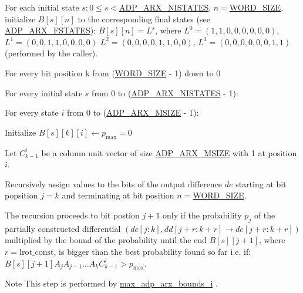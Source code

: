 \begin{DoxyItemize}
\item \-For each initial state $s: 0 \le s <$\hyperlink{adp-arx_8hh_af9236f8d08a54b97ed2199271de979f6}{\-A\-D\-P\-\_\-\-A\-R\-X\-\_\-\-N\-I\-S\-T\-A\-T\-E\-S}, $n =$\hyperlink{common_8hh_a92ed8507d1cd2331ad09275c5c4c1c89}{\-W\-O\-R\-D\-\_\-\-S\-I\-Z\-E}, initialize $B[s][n]$ to the corresponding final states (see \hyperlink{adp-arx_8hh_af70040b1b46c82f1fbe37b5bab89d7db}{\-A\-D\-P\-\_\-\-A\-R\-X\-\_\-\-F\-S\-T\-A\-T\-E\-S})\-: $B[s][n] = L^{s}$, where $L^{0} = (1,1,0,0,0,0,0,0)$, $L^{1} = (0,0,1,1,0,0,0,0)$ $L^{2} = (0,0,0,0,1,1,0,0)$, $L^{3} = (0,0,0,0,0,0,1,1)$ (performed by the caller).
\item \-For every bit position k from (\hyperlink{common_8hh_a92ed8507d1cd2331ad09275c5c4c1c89}{\-W\-O\-R\-D\-\_\-\-S\-I\-Z\-E} -\/ 1) down to 0
\begin{DoxyItemize}
\item \-For every initial state $s$ from 0 to (\hyperlink{adp-arx_8hh_af9236f8d08a54b97ed2199271de979f6}{\-A\-D\-P\-\_\-\-A\-R\-X\-\_\-\-N\-I\-S\-T\-A\-T\-E\-S} -\/ 1)\-:
\begin{DoxyItemize}
\item \-For every state $i$ from 0 to (\hyperlink{adp-arx_8hh_af665f75e00f5755b68319f5907f75823}{\-A\-D\-P\-\_\-\-A\-R\-X\-\_\-\-M\-S\-I\-Z\-E} -\/ 1)\-:
\begin{DoxyItemize}
\item \-Initialize $B[s][k][i] \leftarrow p_{\mathrm{max}} = 0$
\item \-Let $C^{i}_{k-1}$ be a column unit vector of size \hyperlink{adp-arx_8hh_af665f75e00f5755b68319f5907f75823}{\-A\-D\-P\-\_\-\-A\-R\-X\-\_\-\-M\-S\-I\-Z\-E} with 1 at position $i$.
\item \-Recursively assign values to the bits of the output difference $de$ starting at bit popsition $j = k$ and terminating at bit position $n=$\hyperlink{common_8hh_a92ed8507d1cd2331ad09275c5c4c1c89}{\-W\-O\-R\-D\-\_\-\-S\-I\-Z\-E}.
\item \-The recursion proceeds to bit postion $j + 1$ only if the probability $p_j$ of the partially constructed differential $(dc[j:k], dd[j+r:k+r] \rightarrow de[j+r:k+r])$ multiplied by the bound of the probability until the end $B[s][j+1]$, where $r=\mathrm{lrot\_const}$, is bigger than the best probability found so far i.\-e. if\-: $B[s][j+1] A_{j} A_{j-1} \ldots A_{k} C^{i}_{k-1} > p_{\mathrm{max}}$. \begin{DoxyNote}{\-Note}
\-This step is performed by \hyperlink{max-adp-arx_8hh_a0976a49270edcbdfae7c207c0b807a89}{max\-\_\-adp\-\_\-arx\-\_\-bounds\-\_\-i} .
\end{DoxyNote}


\end{DoxyItemize}
\end{DoxyItemize}
\end{DoxyItemize}
\end{DoxyItemize}

